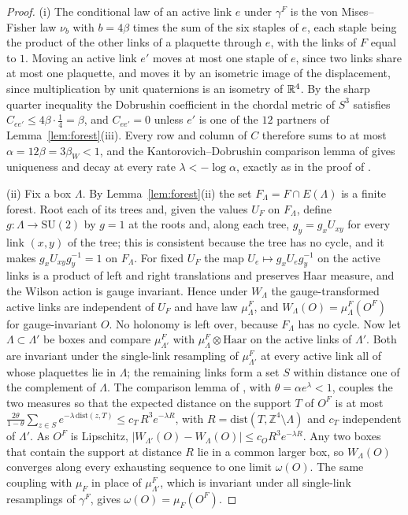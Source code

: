 \begin{proof}
(i) The conditional law of an active link $e$ under $\gamma^{F}$ is the von Mises--Fisher law $\nu_{b}$ with $b=4\beta$ times the sum of the six staples of $e$, each staple being the product of the other links of a plaquette through $e$, with the links of $F$ equal to $1$. Moving an active link $e'$ moves at most one staple of $e$, since two links share at most one plaquette, and moves it by an isometric image of the displacement, since multiplication by unit quaternions is an isometry of $\mathbb{R}^{4}$. By the sharp quarter inequality \cite[Theorem~A]{BB26d} the Dobrushin coefficient in the chordal metric of $S^{3}$ satisfies $C_{ee'}\le4\beta\cdot\frac14=\beta$, and $C_{ee'}=0$ unless $e'$ is one of the $12$ partners of Lemma~\ref{lem:forest}(iii). Every row and column of $C$ therefore sums to at most $\alpha=12\beta=3\beta_{W}<1$, and the Kantorovich--Dobrushin comparison lemma of \cite[Appendix]{BB26d} gives uniqueness and decay at every rate $\lambda<-\log\alpha$, exactly as in the proof of \cite[Theorem~E]{BB26d}.

(ii) Fix a box $\Lambda$. By Lemma~\ref{lem:forest}(ii) the set $F_{\Lambda}=F\cap E(\Lambda)$ is a finite forest. Root each of its trees and, given the values $U_{F}$ on $F_{\Lambda}$, define $g\colon\Lambda\to\mathrm{SU}(2)$ by $g=1$ at the roots and, along each tree, $g_{y}=g_{x}U_{xy}$ for every link $(x,y)$ of the tree; this is consistent because the tree has no cycle, and it makes $g_{x}U_{xy}g_{y}^{-1}=1$ on $F_{\Lambda}$. For fixed $U_{F}$ the map $U_{e}\mapsto g_{x}U_{e}g_{y}^{-1}$ on the active links is a product of left and right translations and preserves Haar measure, and the Wilson action is gauge invariant. Hence under $W_{\Lambda}$ the gauge-transformed active links are independent of $U_{F}$ and have law $\mu^{F}_{\Lambda}$, and $W_{\Lambda}(O)=\mu^{F}_{\Lambda}(O^{F})$ for gauge-invariant $O$. No holonomy is left over, because $F_{\Lambda}$ has no cycle. Now let $\Lambda\subset\Lambda'$ be boxes and compare $\mu^{F}_{\Lambda'}$ with $\mu^{F}_{\Lambda}\otimes\mathrm{Haar}$ on the active links of $\Lambda'$. Both are invariant under the single-link resampling of $\mu^{F}_{\Lambda'}$ at every active link all of whose plaquettes lie in $\Lambda$; the remaining links form a set $S$ within distance one of the complement of $\Lambda$. The comparison lemma of \cite[Appendix]{BB26d}, with $\theta=\alpha e^{\lambda}<1$, couples the two measures so that the expected distance on the support $T$ of $O^{F}$ is at most $\frac{2\theta}{1-\theta}\sum_{z\in S}e^{-\lambda\,\mathrm{dist}(z,T)}\le c_{T}\,R^{3}e^{-\lambda R}$, with $R=\mathrm{dist}(T,\mathbb{Z}^{4}\setminus\Lambda)$ and $c_{T}$ independent of $\Lambda'$. As $O^{F}$ is Lipschitz, $|W_{\Lambda'}(O)-W_{\Lambda}(O)|\le c_{O}R^{3}e^{-\lambda R}$. Any two boxes that contain the support at distance $R$ lie in a common larger box, so $W_{\Lambda}(O)$ converges along every exhausting sequence to one limit $\omega(O)$. The same coupling with $\mu_{F}$ in place of $\mu^{F}_{\Lambda'}$, which is invariant under all single-link resamplings of $\gamma^{F}$, gives $\omega(O)=\mu_{F}(O^{F})$.


\end{proof}
